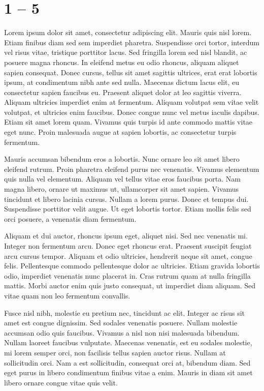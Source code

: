 \documentclass[12pt, a4paper]{article}
\begin{document}
\section{1 -- 5}

Lorem ipsum dolor sit amet, consectetur adipiscing elit. Mauris quis nisl lorem. Etiam finibus diam sed sem imperdiet pharetra. Suspendisse orci tortor, interdum vel risus vitae, tristique porttitor lacus. Sed fringilla lorem sed nisl blandit, ac posuere magna rhoncus. In eleifend metus eu odio rhoncus, aliquam aliquet sapien consequat. Donec cursus, tellus sit amet sagittis ultrices, erat erat lobortis ipsum, at condimentum nibh ante sed nulla. Maecenas dictum lacus elit, eu consectetur sapien faucibus eu. Praesent aliquet dolor at leo sagittis viverra. Aliquam ultricies imperdiet enim at fermentum. Aliquam volutpat sem vitae velit volutpat, et ultricies enim faucibus. Donec congue nunc vel metus iaculis dapibus. Etiam sit amet lorem quam. Vivamus quis turpis id ante commodo mattis vitae eget nunc. Proin malesuada augue at sapien lobortis, ac consectetur turpis fermentum.

Mauris accumsan bibendum eros a lobortis. Nunc ornare leo sit amet libero eleifend rutrum. Proin pharetra eleifend purus nec venenatis. Vivamus elementum quis nulla vel elementum. Aliquam vel tellus vitae eros faucibus porta. Nam magna libero, ornare ut maximus ut, ullamcorper sit amet sapien. Vivamus tincidunt et libero lacinia cursus. Nullam a lorem purus. Donec et tempus dui. Suspendisse porttitor velit augue. Ut eget lobortis tortor. Etiam mollis felis sed orci posuere, a venenatis diam fermentum.

Aliquam et dui auctor, rhoncus ipsum eget, aliquet nisi. Sed nec venenatis mi. Integer non fermentum arcu. Donec eget rhoncus erat. Praesent suscipit feugiat arcu cursus tempor. Aliquam et odio ultricies, hendrerit neque sit amet, congue felis. Pellentesque commodo pellentesque dolor ac ultricies. Etiam gravida lobortis odio, imperdiet venenatis nunc placerat in. Cras rutrum quam at nulla fringilla mattis. Morbi auctor enim quis justo consequat, ut imperdiet diam aliquam. Sed vitae quam non leo fermentum convallis.

Fusce nisl nibh, molestie eu pretium nec, tincidunt ac elit. Integer ac risus sit amet est congue dignissim. Sed sodales venenatis posuere. Nullam molestie accumsan odio quis faucibus. Vivamus a nisl non nisi malesuada bibendum. Nullam laoreet faucibus vulputate. Maecenas venenatis, est eu sodales molestie, mi lorem semper orci, non facilisis tellus sapien auctor risus. Nullam at sollicitudin orci. Nam a est sollicitudin, consequat orci at, bibendum diam. Sed eget purus in libero condimentum finibus vitae a enim. Mauris in diam sit amet libero ornare congue vitae quis velit.
\end{document}
